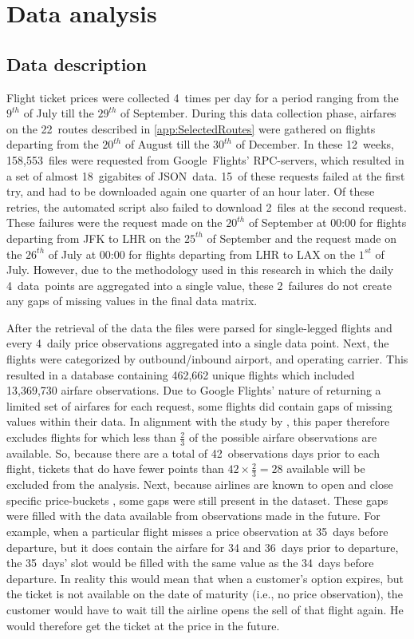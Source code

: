 \chapter{Data analysis}
\label{chap:DataAnalysis}
\section{Data description}
Flight ticket prices were collected 4~times per day for a period ranging from the $9^{th}$ of July till the $29^{th}$ of September. During this data collection phase, airfares on the 22~routes described in \autoref{app:SelectedRoutes} were gathered on flights departing from the $20^{th}$ of August till the $30^{th}$ of December. In these 12~weeks, 158,553~files were requested from Google~Flights' RPC-servers, which resulted in a set of almost 18~gigabites of JSON~data. 15~of these requests failed at the first try, and had to be downloaded again one quarter of an hour later. Of these retries, the automated script also failed to download 2~files at the second request. These failures were the request made on the $20^{th}$ of September at 00:00 for flights departing from JFK to LHR on the $25^{th}$ of September and the request made on the $26^{th}$ of July at 00:00 for flights departing from LHR to LAX on the $1^{st}$ of July. However, due to the methodology used in this research in which the daily 4~data~points are aggregated into a single value, these 2~failures do not create any gaps of missing values in the final data matrix. 

After the retrieval of the data the files were parsed for single-legged flights and every 4~daily price observations aggregated into a single data point. Next, the flights were categorized by outbound/inbound airport, and operating carrier. This resulted in a database containing 462,662 unique flights which included 13,369,730 airfare observations. Due to Google Flights' nature of returning a limited set of airfares for each request, some flights did contain gaps of missing values within their data. In alignment with the study by , this paper therefore excludes flights for which less than $\frac{2}{3}$ of the possible airfare observations are available. So, because there are a total of 42~observations days prior to each flight, tickets that do have fewer points than $42 \times \frac{2}{3} = 28$ available will be excluded from the analysis. Next, because airlines are known to open and close specific price-buckets \cite{mcgill1999revenue}, some gaps were still present in the dataset. These gaps were filled with the data available from observations made in the future. For example, when a particular flight misses a price observation at 35~days before departure, but it does contain the airfare for 34 and 36~days prior to departure, the 35~days' slot would be filled with the same value as the 34~days before departure. In reality this would mean that when a customer's option expires, but the ticket is not available on the date of maturity (i.e., no price observation), the customer would have to wait till the airline opens the sell of that flight again. He would therefore get the ticket at the price in the future. 

